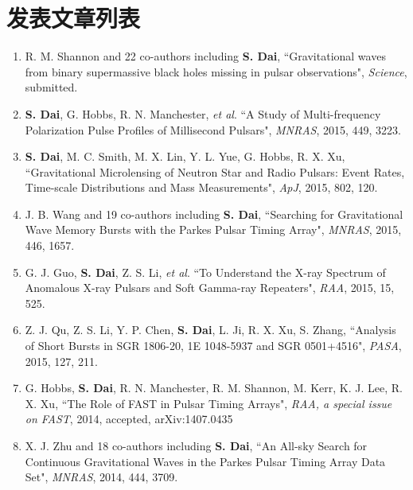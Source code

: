 
\chapter{发表文章列表}

\begin{enumerate}
\item R. M. Shannon and 22 co-authors including \textbf{S. Dai},
``Gravitational waves from binary supermassive black holes missing in pulsar observations", 
\textsl{Science}, submitted.

\item \textbf{S. Dai}, G. Hobbs, R. N. Manchester, \textsl{et al}.
``A Study of Multi-frequency Polarization Pulse Profiles of Millisecond Pulsars",
\textsl{MNRAS}, 2015, 449, 3223.
			    
\item \textbf{S. Dai}, M. C. Smith, M. X. Lin, Y. L. Yue, G. Hobbs, R. X. Xu,
``Gravitational Microlensing of Neutron Star and Radio Pulsars: Event Rates, Time-scale Distributions and Mass Measurements",
\textsl{ApJ}, 2015, 802, 120.

\item J. B. Wang and 19 co-authors including \textbf{S. Dai},
``Searching for Gravitational Wave Memory Bursts with the Parkes Pulsar Timing Array", 
\textsl{MNRAS}, 2015, 446, 1657.

\item G. J. Guo, \textbf{S. Dai}, Z. S. Li, \textsl{et al}.
``To Understand the X-ray Spectrum of Anomalous X-ray Pulsars and Soft Gamma-ray Repeaters",
\textsl{RAA}, 2015, 15, 525.

\item Z. J. Qu, Z. S. Li, Y. P. Chen, \textbf{S. Dai}, L. Ji, R. X. Xu, S. Zhang,
``Analysis of Short Bursts in SGR 1806-20, 1E 1048-5937 and SGR 0501+4516",
\textsl{PASA}, 2015, 127, 211.

\item G. Hobbs, \textbf{S. Dai}, R. N. Manchester, R. M. Shannon, M. Kerr, K. J. Lee, R. X. Xu,
``The Role of FAST in Pulsar Timing Arrays",
\textsl{RAA, a special issue on FAST}, 2014, accepted, arXiv:1407.0435

\item X. J. Zhu and 18 co-authors including \textbf{S. Dai},
``An All-sky Search for Continuous Gravitational Waves in the Parkes Pulsar Timing Array Data Set", 
\textsl{MNRAS}, 2014, 444, 3709.


\end{enumerate}

